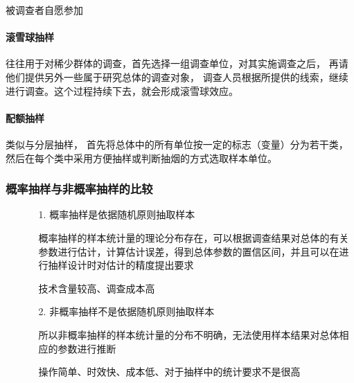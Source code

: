 \documentclass[UTF8,10pt]{book}
\begin{document}
    被调查者自愿参加

    \paragraph{滚雪球抽样}
    
    往往用于对稀少群体的调查，首先选择一组调查单位，对其实施调查之后，
    再请他们提供另外一些属于研究总体的调查对象，
    调查人员根据所提供的线索，继续进行调查。这个过程持续下去，就会形成滚雪球效应。

    \paragraph{配额抽样}

    类似与分层抽样，
    首先将总体中的所有单位按一定的标志（变量）分为若干类，
    然后在每个类中采用方便抽样或判断抽烟的方式选取样本单位。

    \subsubsection{概率抽样与非概率抽样的比较}
        \begin{itemize}
            \item [] {
                \begin{enumerate}
                    
                    \item [1.] 概率抽样是依据随机原则抽取样本
                    
                    {\kaishu 概率抽样的样本统计量的理论分布存在，可以根据调查结果对总体的有关参数进行估计，计算估计误差，得到总体参数的置信区间，并且可以在进行抽样设计时对估计的精度提出要求}
                    
                    技术含量较高、调查成本高
                    
                    \item [2.] 非概率抽样不是依据随机原则抽取样本
                    
                    {\kaishu 所以非概率抽样的样本统计量的分布不明确，无法使用样本结果对总体相应的参数进行推断}
                    
                    操作简单、时效快、成本低、对于抽样中的统计要求不是很高
                                    
                \end{enumerate}
            }
        \end{itemize}
\end{document}
